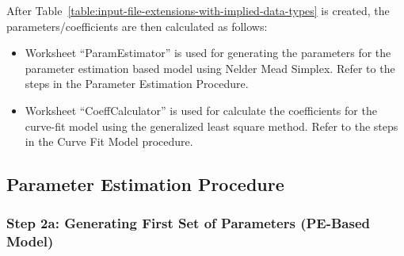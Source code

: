 After Table~\ref{table:input-file-extensions-with-implied-data-types} is created, the parameters/coefficients are then calculated as follows:

\begin{itemize}
\item
  Worksheet ``ParamEstimator'' is used for generating the parameters for the parameter estimation based model using Nelder Mead Simplex. Refer to the steps in the Parameter Estimation Procedure.
\item
  Worksheet ``CoeffCalculator'' is used for calculate the coefficients for the curve-fit model using the generalized least square method. Refer to the steps in the Curve Fit Model procedure.
\end{itemize}

\subsection{Parameter Estimation Procedure}\label{parameter-estimation-procedure}

\subsubsection{Step 2a: Generating First Set of Parameters (PE-Based Model)}\label{step-2a-generating-first-set-of-parameters-pe-based-model}

